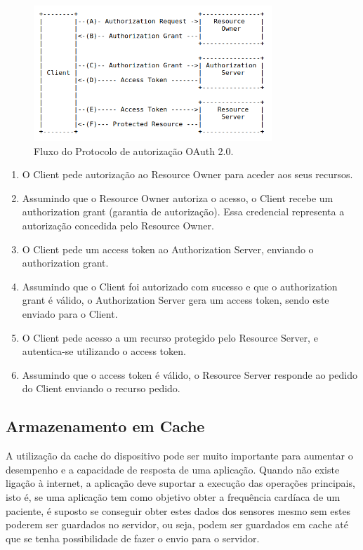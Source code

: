 \begin{figure}[H]
  \centering
  \includegraphics[width=0.8\textwidth]{imgs/oauth2flow.png}
  \caption[Fluxo do Protocolo 2.0]{Fluxo do Protocolo de autorização OAuth 2.0. \cite{oauth20}}
  \label{f:oauth2flow}
\end{figure}

\begin{enumerate}[label=(\Alph*)]
    \item O Client pede autorização ao Resource Owner para aceder aos seus recursos.
    \item Assumindo que o Resource Owner autoriza o acesso, o Client recebe um authorization grant (garantia de autorização). Essa credencial representa a autorização concedida pelo Resource Owner.
    \item O Client pede um access token ao Authorization Server, enviando o authorization grant.
    \item Assumindo que o Client foi autorizado com sucesso e que o authorization grant é válido, o Authorization Server gera um access token, sendo este enviado para o Client.
    \item O Client pede acesso a um recurso protegido pelo Resource Server, e autentica-se utilizando o access token.
    \item Assumindo que o access token é válido, o Resource Server responde ao pedido do Client enviando o recurso pedido.
\end{enumerate}

\subsection{Armazenamento em Cache}

A utilização da cache do dispositivo pode ser muito importante para aumentar o desempenho e a capacidade de resposta de uma aplicação. Quando não existe ligação à internet, a aplicação deve suportar a execução das operações principais, isto é, se uma aplicação tem como objetivo obter a frequência cardíaca de um paciente, é suposto se conseguir obter estes dados dos sensores mesmo sem estes poderem ser guardados no servidor, ou seja, podem ser guardados em cache até que se tenha possibilidade de fazer o envio para o servidor.

